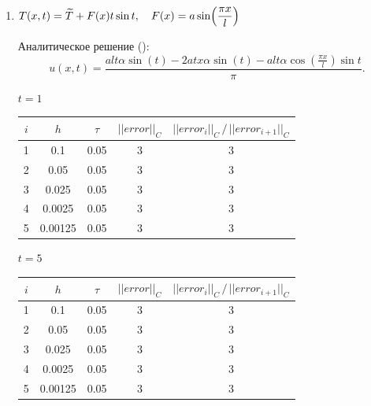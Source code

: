 \documentclass[12pt,a4paper]{article}
\begin{document}
  \begin{enumerate}
    \item $T(x, t) = \widetilde{T} + F(x) t \sin t, \quad F(x) = a \sin \Bigl( \dfrac{\pi x}{l} \Bigr)$
    
    Аналитическое решение ():
    \[
      u(x, t) = \dfrac{a l t \alpha \sin(t) - 2 a t x \alpha \sin(t) - a l t \alpha \cos (\tfrac{\pi x}{l}) \sin t}{\pi}.
    \]

    \centerline{$t = 1$}
    \vspace{0.5em}
    \begin{center}
      \begin{tabular}{|c|c|c|c|c|}
        \hline
        $i$ & $h$     & $\tau$ & $|| error ||_C$ & $|| error_i ||_C \, / \, || error_{i+1} ||_C$ \\
        \hline
        1   & 0.1     & 0.05   & 3 & 3 \\
        \hline 
        2   & 0.05    & 0.05   & 3 & 3 \\
        \hline
        3   & 0.025   & 0.05   & 3 & 3 \\
        \hline
        4   & 0.0025  & 0.05   & 3 & 3 \\
        \hline 
        5   & 0.00125 & 0.05   & 3 & 3 \\
        \hline
      \end{tabular}
    \end{center}

    \pagebreak

    \centerline{$t = 5$}
    \vspace{0.5em}
    \begin{center}
      \begin{tabular}{|c|c|c|c|c|}
        \hline
        $i$ & $h$     & $\tau$ & $|| error ||_C$ & $|| error_i ||_C \, / \, || error_{i+1} ||_C$ \\
        \hline
        1   & 0.1     & 0.05   & 3 & 3 \\
        \hline 
        2   & 0.05    & 0.05   & 3 & 3 \\
        \hline
        3   & 0.025   & 0.05   & 3 & 3 \\
        \hline
        4   & 0.0025  & 0.05   & 3 & 3 \\
        \hline 
        5   & 0.00125 & 0.05   & 3 & 3 \\
        \hline
      \end{tabular}
    \end{center}

    \vspace{1cm}


\end{enumerate}
\end{document}
